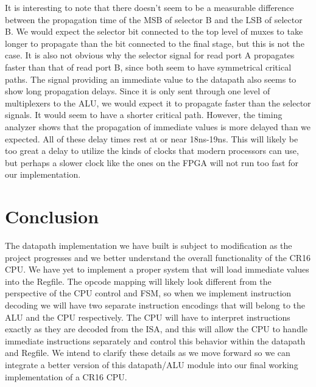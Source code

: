 \documentclass[conference]{IEEEtran}
\begin{document}
It is interesting to note that there doesn't seem to be a measurable difference between the propagation time of the MSB of selector B and the LSB of selector B. We would expect the selector bit connected to the top level of muxes to take longer to propagate than the bit connected to the final stage, but this is not the case. It is also not obvious why the selector signal for read port A propagates faster than that of read port B, since both seem to have symmetrical critical paths.
The signal providing an immediate value to the datapath also seems to show long propagation delays. Since it is only sent through one level of multiplexers to the ALU, we would expect it to propagate faster than the selector signals. It would seem to have a shorter critical path. However, the timing analyzer shows that the propagation of immediate values is more delayed than we expected. All of these delay times rest at or near 18ns-19ns. This will likely be too great a delay to utilize the kinds of clocks that modern processors can use, but perhaps a slower clock like the ones on the FPGA will not run too fast for our implementation.

\section{Conclusion}
The datapath implementation we have built is subject to modification as the project progresses and we better understand the overall functionality of the CR16 CPU. We have yet to implement a proper system that will load immediate values into the Regfile. The opcode mapping will likely look different from the perspective of the CPU control and FSM, so when we implement instruction decoding we will have two separate instruction encodings that will belong to the ALU and the CPU respectively. The CPU will have to interpret instructions exactly as they are decoded from the ISA, and this will allow the CPU to handle immediate instructions separately and control this behavior within the datapath and Regfile. We intend to clarify these details as we move forward so we can integrate a better version of this datapath/ALU module into our final working implementation of a CR16 CPU.
\end{document}
